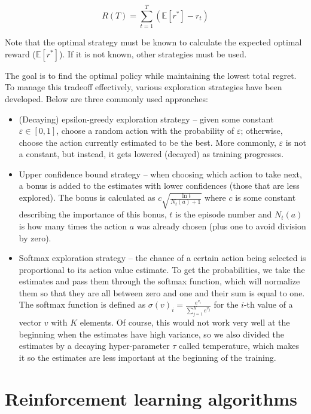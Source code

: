 \documentclass[
  digital,     %
  oneside,     %
  nosansbold,  %
  nocolorbold, %
  lof,         %
  lot,         %
]{fithesis4}
\begin{document}
\begin{equation}
R(T) = \sum_{t=1}^{T}(\mathbb{E}[r^*]-r_t)
\end{equation}

Note that the optimal strategy must be known to calculate the expected optimal reward ($\mathbb{E}[r^*]$). If it is not known, other strategies must be used.

The goal is to find the optimal policy while maintaining the lowest total regret. To manage this tradeoff effectively, various exploration strategies have been developed. Below are three commonly used approaches:

\begin{itemize}
    \item (Decaying) epsilon-greedy exploration strategy -- given some constant $\varepsilon \in [0,1]$, choose a random action with the probability of $\varepsilon$; otherwise, choose the action currently estimated to be the best. More commonly, $\varepsilon$ is not a constant, but instead, it gets lowered (decayed) as training progresses.
    \item Upper confidence bound strategy -- when choosing which action to take next, a bonus is added to the estimates with lower confidences (those that are less explored). The bonus is calculated as $c\sqrt{\frac{\ln{t}}{N_t(a)+1}}$ where $c$ is some constant describing the importance of this bonus, $t$ is the episode number and $N_t(a)$ is how many times the action $a$ was already chosen (plus one to avoid division by zero).
    \item Softmax exploration strategy -- the chance of a certain action being selected is proportional to its action value estimate. To get the probabilities, we take the estimates and pass them through the softmax function, which will normalize them so that they are all between zero and one and their sum is equal to one. The softmax function is defined as $\sigma (v)_i = \frac{e^{v_i}}{\sum^{K}_{j=1}e^{v_j}}$ for the $i$-th value of a vector $v$ with $K$ elements. Of course, this would not work very well at the beginning when the estimates have high variance, so we also divided the estimates by a decaying hyper-parameter $\tau$ called temperature, which makes it so the estimates are less important at the beginning of the training.
\end{itemize}


\section{Reinforcement learning algorithms}
\label{sec:algos}
\end{document}
